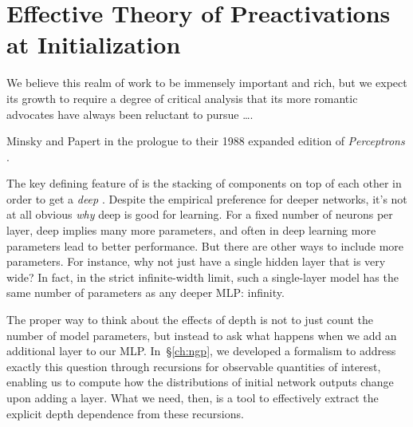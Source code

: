 \chapter{Effective Theory of Preactivations at Initialization}\label{ch:signalprop}
\label{ch:eft-mlp}


\epigraph{We believe this realm of work to be immensely important and rich, but we expect its growth to require a degree of critical analysis that its more romantic advocates have always been reluctant to pursue \dots.}{
Minsky and 
Papert in the prologue to their 1988 expanded edition of \emph{Perceptrons} \cite{miskypapertperceptron}.}





\noindent{}The key defining feature of  is the stacking of components on top of each other in order to get a \emph{deep}  .
Despite the empirical preference for deeper networks, it's not at all obvious \emph{why} deep is good for learning. For a fixed number of neurons per layer, deep implies many more parameters, and often in deep learning more parameters lead to better performance. But there are other ways to include more parameters. For instance, why not just have a single hidden layer that is very wide?
In fact, in the strict infinite-width limit, such a single-layer model has the same number of parameters as any deeper MLP: infinity.

The proper way to think about the effects of depth is not to just count the number of model parameters, but instead to ask what happens when we add an additional layer to our MLP. In~\S\ref{ch:ngp}, we developed a formalism to address exactly this question through recursions for observable quantities of interest, enabling us to compute how the distributions of initial network outputs change upon adding a layer.
What we need, then, is a tool to effectively extract the explicit depth dependence from these recursions.




